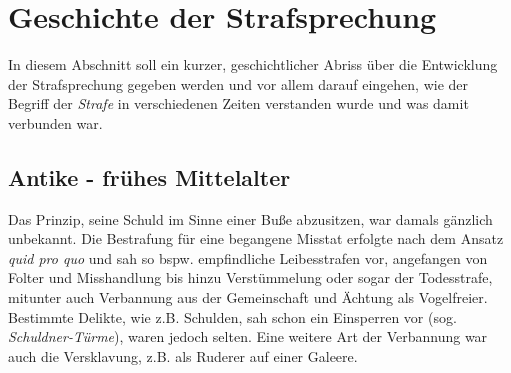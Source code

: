 \section{Geschichte der Strafsprechung}
In diesem Abschnitt soll ein kurzer, geschichtlicher Abriss über die Entwicklung der Strafsprechung gegeben werden und vor allem darauf eingehen, wie der Begriff der \textit{Strafe} in verschiedenen Zeiten verstanden wurde und was damit verbunden war.

\subsection{Antike - frühes Mittelalter}
Das Prinzip, seine Schuld im Sinne einer Buße abzusitzen, war damals gänzlich unbekannt. Die Bestrafung für eine begangene Misstat erfolgte nach dem Ansatz \textit{quid pro quo} und sah so bspw. empfindliche Leibesstrafen vor, angefangen von Folter und Misshandlung bis hinzu Verstümmelung oder sogar der Todesstrafe, mitunter auch Verbannung aus der Gemeinschaft und Ächtung als Vogelfreier.
Bestimmte Delikte, wie z.B. Schulden, sah schon ein Einsperren vor (sog. \textit{Schuldner-Türme}), waren jedoch selten. Eine weitere Art der Verbannung war auch die Versklavung, z.B. als Ruderer auf einer Galeere.